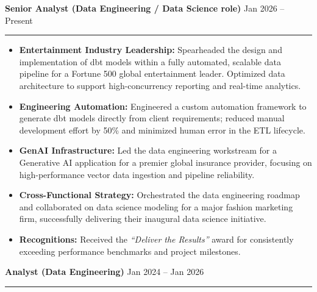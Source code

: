 \textbf{Senior Analyst (Data Engineering / Data Science role)} \hfill Jan 2026 – Present
\vspace{0.2cm}
\hrule
\vspace{0.2cm}

\begin{itemize}[leftmargin=0.5cm]
\item \textbf{Entertainment Industry Leadership:} Spearheaded the design and implementation of dbt models within a fully automated, scalable data pipeline for a Fortune 500 global entertainment leader. Optimized data architecture to support high-concurrency reporting and real-time analytics.
\item \textbf{Engineering Automation:} Engineered a custom automation framework to generate dbt models directly from client requirements; reduced manual development effort by 50\% and minimized human error in the ETL lifecycle.
\item \textbf{GenAI Infrastructure:} Led the data engineering workstream for a Generative AI application for a premier global insurance provider, focusing on high-performance vector data ingestion and pipeline reliability.
\item \textbf{Cross-Functional Strategy:} Orchestrated the data engineering roadmap and collaborated on data science modeling for a major fashion marketing firm, successfully delivering their inaugural data science initiative.
\item \textbf{Recognitions:} Received the \textit{``Deliver the Results''} award for consistently exceeding performance benchmarks and project milestones.
\end{itemize}

\vspace{0.2cm}
\textbf{Analyst (Data Engineering)} \hfill Jan 2024 – Jan 2026
\vspace{0.1cm}
\hrule
\vspace{0.2cm}


